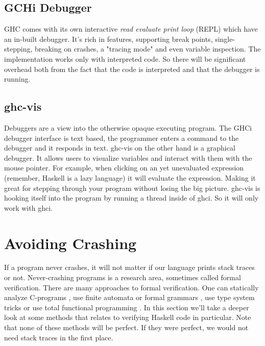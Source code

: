 \subsection{GCHi Debugger}

GHC comes with its own interactive \emph{read evaluate print loop} (REPL)
which have an in-built debugger. It's rich in features, supporting break
points, single-stepping, breaking on crashes, a "tracing mode" and even
variable inspection. The implementation works only with interpreted
code. \cite{ghci_debugger} So there will be significant overhead both
from the fact that the code is interpreted and that the debugger is
running.


\subsection{ghc-vis}

Debuggers are a view into the otherwise opaque executing program. The
GHCi debugger interface is text based, the programmer enters a command
to the debugger and it responds in text.  ghc-vis on the other hand is a
graphical debugger.  It allows users to visualize variables and interact
with them with the mouse pointer. For example, when clicking on an yet
unevaluated expression (remember, Haskell is a lazy language) it will
evaluate the expression.  Making it great for stepping through your
program without losing the big picture.  ghc-vis is hooking itself into
the program by running a thread inside of ghci. So it will only work
with ghci.  \cite{thesisFelsingBA}

\section{Avoiding Crashing} \label{sec:avoiding_crashing}

If a program never crashes,
it will not matter if our language prints stack traces or not. Never-crashing programs is a research area, sometimes called formal
verification. There are many approaches to formal verification. One
can statically analyze C-programs \cite{ckl2004},
use finite automata
or formal grammars \cite{dantam2013motion} \cite{rouhani2013software},
use type system tricks \cite{cheney2003first}
or use total functional programming \cite{Turner:jucs_10_7:total_functional_programming}.
In this section we'll take a deeper look at some methods that
relates to verifying Haskell code in particular. Note that none
of these methods will be perfect. If they were perfect, we would not
need stack traces in the first place.

